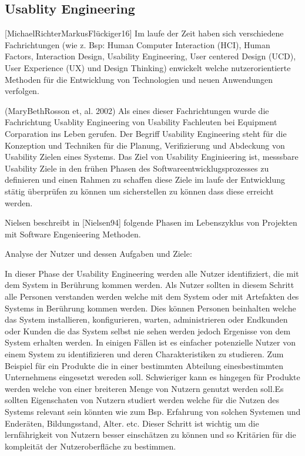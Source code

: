 \subsection{Usablity Engineering}

[MichaelRichterMarkusFlückiger16]  Im laufe der Zeit haben sich verschiedene Fachrichtungen (wie z. Bsp: Human Computer Interaction (HCI), Human Factors, Interaction Design, Usability Engineering, 
User centered Design (UCD), User Experience (UX) und Design Thinking)  enwickelt welche nutzerorientierte Methoden für die Entwicklung von Technologien und neuen Anwendungen verfolgen. 

(MaryBethRosson et, al. 2002) Als eines dieser Fachrichtungen wurde die Fachrichtung Usablity Engineering von Usability Fachleuten bei Equipment Corparation ins Leben gerufen.  
Der Begriff Usability Engineering steht für die Konzeption und Techniken für die Planung, Verifizierung und Abdeckung von Usability Zielen eines Systems. Das Ziel von Usability Enginieering ist, 
messsbare Usability Ziele in den frühen Phasen des Softwareentwicklugsprozesses zu definieren und einen Rahmen zu schaffen diese Ziele im laufe der Entwicklung stätig überprüfen zu können 
um sicherstellen zu können dass diese erreicht werden.

Nielsen beschreibt in [Nielsen94] folgende Phasen im Lebenszyklus von Projekten mit Software Engenieering Methoden.

Analyse der Nutzer und dessen Aufgaben und Ziele:  

In dieser Phase der Usability Engineering werden alle Nutzer identifiziert, die mit dem System in Berührung kommen werden. Als Nutzer sollten in diesem Schritt alle Personen 
verstanden werden welche mit dem System oder mit Artefakten des Systems in Berührung kommen werden. Dies können Personen beinhalten welche das System installieren, konfigurieren, 
warten, administrieren oder Endkunden oder Kunden die das System selbst nie sehen werden jedoch Ergenisse von dem System erhalten werden.  In einigen Fällen ist es einfacher potenzielle 
Nutzer von einem System zu identifizieren und deren Charakteristiken zu studieren. Zum Beispiel für ein Produkte die in einer bestimmten Abteilung einesbestimmten Unternehmens eingesetzt 
wereden soll. Schwieriger kann es hingegen für Produkte werden welche von einer breiteren Menge von Nutzern genutzt werden soll.Es sollten Eigenschaten von Nutzern studiert werden 
welche für die Nutzen des Systems relevant sein könnten wie zum Bsp. Erfahrung von solchen Systemen und Enderäten, Bildungsstand, Alter. etc. Dieser Schritt ist wichtig um die lernfährigkeit 
von Nutzern besser einschätzen zu können und so Kritärien für die kompleität der Nutzeroberfläche zu bestimmen.

